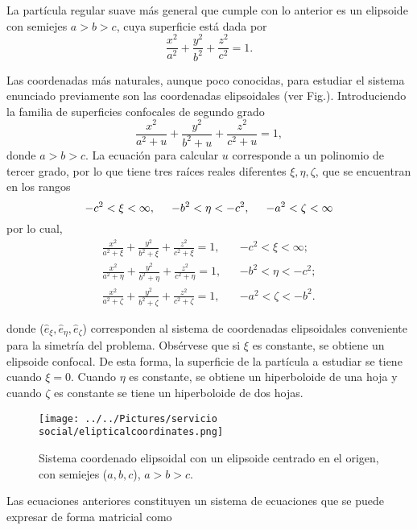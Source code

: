 \documentclass[paper=letter, fontsize=12pt,]{article}
\newcommand{\uvec}[1]{\hat{e}_{#1}}
\begin{document}
La partícula regular suave más general que cumple con lo anterior es un elipsoide con semiejes $a > b > c$, cuya superficie está dada por 
\begin{equation}
    \frac{x^2}{a^2}+\frac{y^2}{b^2}+\frac{z^2}{c^2}=1.
\end{equation}

Las coordenadas más naturales, aunque poco conocidas, para estudiar el sistema enunciado previamente son las coordenadas elipsoidales (ver Fig.). Introduciendo la familia de superficies confocales de segundo grado \cite{Math}
\begin{equation}
    \frac{x^2}{a^2+u}+\frac{y^2}{b^2+u}+\frac{z^2}{c^2+u}=1,
\end{equation}
donde $a>b>c$. La ecuación para calcular $u$ corresponde a un polinomio de tercer grado, por lo que tiene tres raíces reales diferentes $\xi,\eta,\zeta$, que se encuentran en los rangos
\begin{equation}
    -c^2<\xi<\infty,\hspace{0.5cm}-b^2<\eta<-c^2,\hspace{0.5cm}-a^2<\zeta<\infty
\end{equation}
por lo cual, 
\begin{align}
    \frac{x^2}{a^2+\xi}+\frac{y^2}{b^2+\xi}+\frac{z^2}{c^2+\xi}=1,&& -c^2<\xi<\infty;\\
    \frac{x^2}{a^2+\eta}+\frac{y^2}{b^2+\eta}+\frac{z^2}{c^2+\eta}=1,&& -b^2<\eta<-c^2;\\
    \frac{x^2}{a^2+\zeta}+\frac{y^2}{b^2+\zeta}+\frac{z^2}{c^2+\zeta}=1,&& -a^2<\zeta<-b^2.
\end{align}

donde ($\uvec{\xi},\uvec{\eta},\uvec{\zeta}$) corresponden al sistema de coordenadas elipsoidales  conveniente para la simetría del problema. Obsérvese que si $\xi$ es constante, se obtiene un elipsoide confocal. De esta forma, la superficie de la partícula a estudiar se tiene cuando $\xi=0$. Cuando $\eta$ es constante, se obtiene un hiperboloide de una hoja y cuando $\zeta$ es constante se tiene un hiperboloide de dos hojas.\\
\begin{figure}[H]
    \centering
    \texttt{[image: ../../Pictures/servicio social/elipticalcoordinates.png]} 
    \caption{Sistema coordenado elipsoidal con un elipsoide centrado en el origen, con semiejes ($a, b, c$), $a > b > c.$}
    \label{fig:enter-label}
\end{figure}

Las ecuaciones anteriores constituyen un sistema de ecuaciones que se puede expresar de forma matricial como
\end{document}
